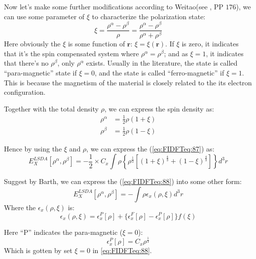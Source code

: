 Now let's make some further modifications according to Weitao(see
\cite{weitaoYang}, PP $176$), we can use some parameter of $\xi$ to
characterize the polarization state:
\begin{equation}\label{}
\xi = \frac{\rho^{\alpha} - \rho^{\beta}}{\rho} =
\frac{\rho^{\alpha} - \rho^{\beta}}{\rho^{\alpha} + \rho^{\beta}}
\end{equation}
Here obviously the $\xi$ is some function of $\bm{r}$: $\xi =
\xi(\bm{r})$. If $\xi$ is zero, it indicates that it's the spin
compensated system where $\rho^{\alpha} = \rho^{\beta}$; and as $\xi
= 1$, it indicates that there's no $\rho^{\beta}$, only
$\rho^{\alpha}$ exists. Usually in the literature, the state is called 
``para-magnetic'' state if $\xi = 0$, and the state is called
``ferro-magnetic'' if $\xi = 1$. This is because the magnetism of the
material is closely related to the its electron configuration.

Together with the total density $\rho$, we can express the spin
density as:
\begin{align}\label{}
\rho^{\alpha} &= \frac{1}{2}\rho(1+\xi) \nonumber \\
\rho^{\beta}  &= \frac{1}{2}\rho(1-\xi)
\end{align}

Hence by using the $\xi$ and $\rho$, we can express the
(\ref{eq:FIDFTeq:87}) as:
\begin{equation}\label{eq:FIDFTeq:88}
E_{X}^{LSDA}[\rho^{\alpha}, \rho^{\beta}] = -\frac{1}{2}\times
C_{x}\int \rho\left\{\rho^{\frac{1}{3}}[(1+\xi)^{\frac{4}{3}} +
(1-\xi)^{\frac{4}{3}}]\right\} d^{3}r
\end{equation}

Suggest by Barth\cite{1972JPhC....5.1629V}, we can express the
(\ref{eq:FIDFTeq:88}) into some other form:
\begin{equation}\label{LDA_Exchange_polarize_eq:1}
E_{X}^{LSDA}[\rho^{\alpha}, \rho^{\beta}] = -\int \rho
\epsilon_{x}(\rho, \xi)d^{3}r
\end{equation}
Where the $\epsilon_{x}(\rho, \xi)$ is:
\begin{equation}\label{LDA_Exchange_polarize_eq:5}
\epsilon_{x}(\rho, \xi) = \epsilon_{x}^{P}[\rho] + \{
\epsilon_{x}^{F}[\rho] - \epsilon_{x}^{P}[\rho] \}f(\xi)
\end{equation}

Here ``P'' indicates the para-magnetic ($\xi = 0$):
\begin{equation}\label{LDA_Exchange_polarize_eq:2}
\epsilon_{x}^{P}[\rho] = C_{x}\rho^{\frac{1}{3}}
\end{equation}
Which is gotten by set $\xi = 0$ in \ref{eq:FIDFTeq:88}.

